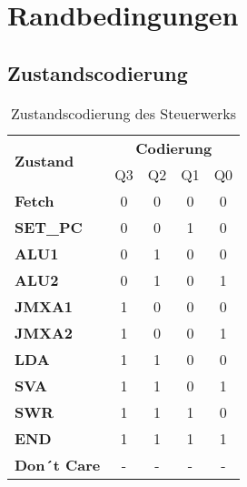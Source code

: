 \chapter{Randbedingungen}
\label{chap:randbedingungen}

\section{Zustandscodierung}
\label{sec:Zustandscodierung}

\begin{table} [H]
    \centering
    \begin{tabular}{|l|c|c|c|c|}
        \hline
        \multirow{2}{*}{\textbf{Zustand}} & \multicolumn{4}{c}{\textbf{Codierung}}                \\

                                          & Q3                                     & Q2 & Q1 & Q0 \\
        \hline
        \textbf{Fetch}                    & 0                                      & 0  & 0  & 0  \\
        \hline
        \textbf{SET\_PC}                  & 0                                      & 0  & 1  & 0  \\
        \hline
        \textbf{ALU1}                     & 0                                      & 1  & 0  & 0  \\
        \hline
        \textbf{ALU2}                     & 0                                      & 1  & 0  & 1  \\
        \hline
        \textbf{JMXA1}                    & 1                                      & 0  & 0  & 0  \\
        \hline
        \textbf{JMXA2}                    & 1                                      & 0  & 0  & 1  \\
        \hline
        \textbf{LDA}                      & 1                                      & 1  & 0  & 0  \\
        \hline
        \textbf{SVA}                      & 1                                      & 1  & 0  & 1  \\
        \hline
        \textbf{SWR}                      & 1                                      & 1  & 1  & 0  \\
        \hline
        \textbf{END}                      & 1                                      & 1  & 1  & 1  \\
        \hline
        \textbf{Don´t Care}               & -                                      & -  & -  & -  \\
        \hline
    \end{tabular}
    \caption{Zustandscodierung des Steuerwerks}
    \label{tab:Zustandscodierung}
\end{table}